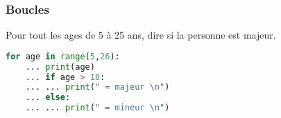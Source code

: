 \documentclass{beamer}
\begin{document}
\begin{frame}[fragile]
    \frametitle{Boucles}

    Pour tout les ages de 5 à 25 ans, dire si la personne est majeur.
    \begin{lstlisting}[language=python]
    for age in range(5,26):
    ... print(age)
    ... if age > 18:
    ... ... print(" = majeur \n")
    ... else:
    ... ... print(" = mineur \n")
    \end{lstlisting}
\end{frame}
\end{document}
